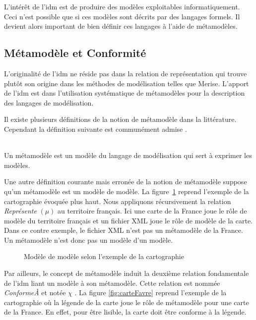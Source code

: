 L'intérêt de l'\gls{idm} est de produire des modèles exploitables informatiquement. 
Ceci n'est possible que si ces modèles sont décrits par des langages formels. Il 
devient alors important de bien définir ces langages à l'aide de métamodèles.

\subsection{Métamodèle et Conformité}
L'originalité de l'\gls{idm} ne réside pas dans la relation de représentation qui 
trouve plutôt son origine dans les méthodes de modélisation telles que Merise. L'apport de l'\gls{idm} est dans l'utilisation systématique de métamodèles pour la description des langages de modélisation. 

Il existe plusieurs définitions de la notion de métamodèle dans la littérature. 
Cependant la définition suivante est communément admise \cite{bezivin2004rapport}.
\\\

\begin{definition}
Un métamodèle est un modèle du langage de modélisation qui sert à exprimer les 
modèles.
\end{definition}

Une autre définition courante mais erronée de la notion de métamodèle suppose 
qu'un métamodèle est un modèle de modèle. La figure~\ref{fig:modelofmodel} 
reprend l'exemple de la cartographie évoquée plus haut. Nous appliquons 
récursivement la relation \textit{Représente} $(\mu)$ au territoire 
français. Ici une carte de la France joue le rôle de modèle du territoire 
français et un fichier XML joue le rôle de modèle de la carte. Dans ce contre 
exemple, le fichier XML n'est pas un métamodèle de la France. Un métamodèle 
n'est donc pas un modèle d'un modèle.

\begin{figure}[!ht]
    \begin{center}
        
    \end{center}
    \caption{Modèle de modèle selon l'exemple de la cartographie 
    \protect\cite{favre2006ingenierie}}
    \label{fig:modelofmodel}
\end{figure}

Par ailleurs, le concept de métamodèle induit la deuxième relation fondamentale 
de l'\gls{idm} liant un modèle à son métamodèle. Cette relation est nommée 
\textit{ConformeÀ} et notée $\chi$ \cite{bezivin2004search} 
\cite{favre2004towards}. La figure \ref{fig:carteFavre} reprend l'exemple de la 
cartographie où la légende de la carte joue le rôle de métamodèle pour 
une carte de la France. En effet, pour être lisible, la carte doit être conforme 
à la légende.

